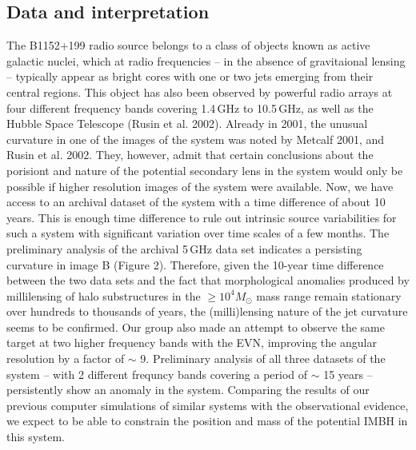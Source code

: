 \documentclass[a4paper, 11pt]{article}
\begin{document}
\subsection{Data and interpretation}
The B1152+199 radio source belongs to a class of objects known as active galactic nuclei, which at radio frequencies -- in the absence of gravitaional lensing -- typically appear as bright cores with one or two jets emerging from their central regions. This object has also been observed by powerful radio arrays at four different frequency bands covering 1.4\,GHz to 10.5\,GHz, as well as the Hubble Space Telescope (Rusin et al. 2002). Already in 2001, the unusual curvature in one of the images of the system was noted by Metcalf 2001, and Rusin et al. 2002. They, however, admit that certain conclusions about the porisiont and nature of the potential secondary lens in the system would only be possible if higher resolution images of the system were available. Now, we have access to an archival dataset of the system with a time difference of about 10 years. This is enough time difference to rule out intrinsic source variabilities for such a system with significant variation over time scales of a few months. The preliminary analysis of the archival 5\,GHz data set indicates a persisting curvature in image B (Figure 2). Therefore, given the 10-year time difference between the two data sets and the fact that morphological anomalies produced by millilensing of halo substructures in the $\geq 10^4 M_\odot$ mass range remain stationary over hundreds to thousands of years, the (milli)lensing nature of the jet curvature seems to be confirmed. Our group also made an attempt to observe the same target at two higher frequency bands with the EVN, improving the angular resolution by a factor of $\sim$ 9. Preliminary analysis of all three datasets of the system -- with 2 different frequncy bands covering a period of $\sim$ 15 years -- persistently show an anomaly in the system. Comparing the results of our previous computer simulations of similar systems with the observational evidence, we expect to be able to constrain the position and mass of the potential IMBH in this system.
\end{document}
